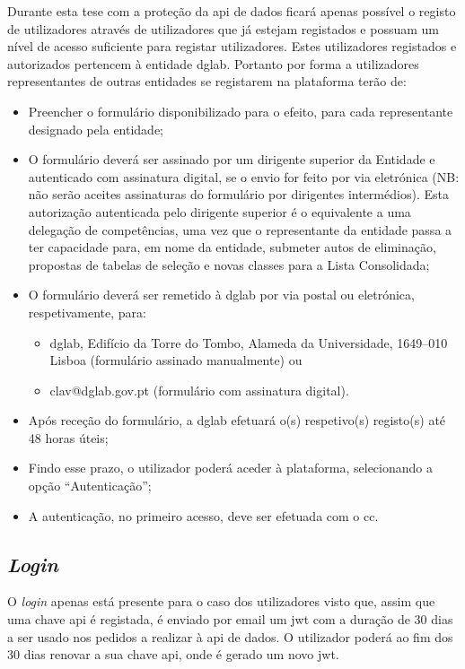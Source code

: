 Durante esta tese com a proteção da \acrshort{api} de dados ficará apenas possível o registo de utilizadores através de utilizadores que já estejam registados e possuam um nível de acesso suficiente para registar utilizadores. Estes utilizadores registados e autorizados pertencem à entidade \acrshort{dglab}. Portanto por forma a utilizadores representantes de outras entidades se registarem na plataforma terão de:~\cite{clavwebpage}
\begin{itemize}
    \item Preencher o formulário disponibilizado para o efeito, para cada representante designado pela entidade;
    \item O formulário deverá ser assinado por um dirigente superior da Entidade e autenticado com assinatura digital, se o envio for feito por via eletrónica (NB\@: não serão aceites assinaturas do formulário por dirigentes intermédios). Esta autorização autenticada pelo dirigente superior é o equivalente a uma delegação de competências, uma vez que o representante da entidade passa a ter capacidade para, em nome da entidade, submeter autos de eliminação, propostas de tabelas de seleção e novas classes para a Lista Consolidada;
    \item O formulário deverá ser remetido à \acrshort{dglab} por via postal ou eletrónica, respetivamente, para:
    \begin{itemize}
        \item \acrshort{dglab}, Edifício da Torre do Tombo, Alameda da Universidade, 1649--010 Lisboa (formulário assinado manualmente) ou
        \item clav@dglab.gov.pt (formulário com assinatura digital).
    \end{itemize}
    \item Após receção do formulário, a \acrshort{dglab} efetuará o(s) respetivo(s) registo(s) até 48 horas úteis;
    \item Findo esse prazo, o utilizador poderá aceder à plataforma, selecionando a opção ``Autenticação'';
    \item A autenticação, no primeiro acesso, deve ser efetuada com o \acrlong{cc}.
\end{itemize}

\subsection{\textit{Login}}

O \textit{login} apenas está presente para o caso dos utilizadores visto que, assim que uma chave \acrshort{api} é registada, é enviado por email um \acrshort{jwt} com a duração de 30 dias a ser usado nos pedidos a realizar à \acrshort{api} de dados. O utilizador poderá ao fim dos 30 dias renovar a sua chave \acrshort{api}, onde é gerado um novo \acrshort{jwt}.

